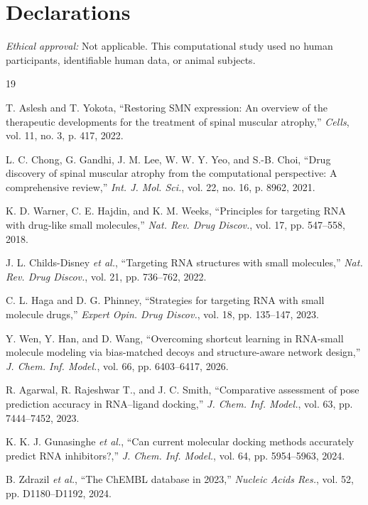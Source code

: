 \documentclass[journal]{IEEEtran}
\begin{document}
\section*{Declarations}

\textit{Ethical approval:} Not applicable. This computational study used
no human participants, identifiable human data, or animal subjects.

\begin{thebibliography}{19}

T. Aslesh and T. Yokota, ``Restoring SMN expression: An overview of the
therapeutic developments for the treatment of spinal muscular
atrophy,'' \emph{Cells}, vol. 11, no. 3, p. 417, 2022.

L. C. Chong, G. Gandhi, J. M. Lee, W. W. Y. Yeo, and S.-B. Choi,
``Drug discovery of spinal muscular atrophy from the computational
perspective: A comprehensive review,'' \emph{Int. J. Mol. Sci.},
vol. 22, no. 16, p. 8962, 2021.

K. D. Warner, C. E. Hajdin, and K. M. Weeks, ``Principles for targeting
RNA with drug-like small molecules,'' \emph{Nat. Rev. Drug Discov.},
vol. 17, pp. 547--558, 2018.

J. L. Childs-Disney \emph{et al.}, ``Targeting RNA structures with small
molecules,'' \emph{Nat. Rev. Drug Discov.}, vol. 21, pp. 736--762, 2022.

C. L. Haga and D. G. Phinney, ``Strategies for targeting RNA with small
molecule drugs,'' \emph{Expert Opin. Drug Discov.}, vol. 18,
pp. 135--147, 2023.

Y. Wen, Y. Han, and D. Wang, ``Overcoming shortcut learning in
RNA-small molecule modeling via bias-matched decoys and structure-aware
network design,'' \emph{J. Chem. Inf. Model.}, vol. 66,
pp. 6403--6417, 2026.

R. Agarwal, R. Rajeshwar T., and J. C. Smith, ``Comparative assessment
of pose prediction accuracy in RNA--ligand docking,'' \emph{J. Chem.
Inf. Model.}, vol. 63, pp. 7444--7452, 2023.

K. K. J. Gunasinghe \emph{et al.}, ``Can current molecular docking
methods accurately predict RNA inhibitors?,'' \emph{J. Chem. Inf.
Model.}, vol. 64, pp. 5954--5963, 2024.

B. Zdrazil \emph{et al.}, ``The ChEMBL database in 2023,''
\emph{Nucleic Acids Res.}, vol. 52, pp. D1180--D1192, 2024.


\end{thebibliography}
\end{document}
